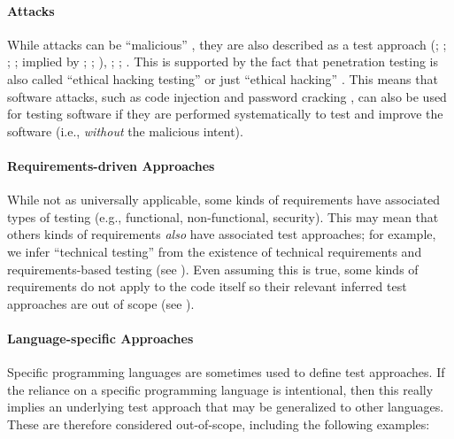    \paragraph{Attacks}\label{attacks}
    While attacks can be ``malicious'' \citep[p.~7]{IEEE2017}, they are also
    described as a test approach \ifnotpaper
        (\citeyear[pp.~4, 34]{IEEE2022}; \citeyear[p.~4]{IEEE2021};
        \citeyear[p.~7]{IEEE2019a}; \citealpISTQB{}; implied by
        \citealp[p.~5\=/10]{SWEBOK2024}; \citealp[p.~26]{Bas2024};
        \citealp[p.~87\==89]{Patton2006})\else \cite[pp.~4, 34]{IEEE2022},
        \cite[p.~4]{IEEE2021}; \cite[p.~7]{IEEE2019a}; \cite{ISTQB}\fi.
    This is supported by the fact that penetration testing is also called
    ``ethical hacking testing'' \citep[p.~13\=/4]{SWEBOK2024} or just ``ethical
    hacking'' \citep[p.~28; see ]{Gerrard2000b}. This
    means that software attacks, such as code injection and password cracking
    \citepISTQB{}, can also be used for testing software if they are performed
    systematically to test and improve the software (i.e., \emph{without} the
    malicious intent).

    \paragraph{Requirements-driven Approaches}\label{req-test}
    While not as universally applicable, some kinds of requirements have associated
    types of testing (e.g., functional, non-functional, security). This may mean
    that others kinds of requirements \emph{also} have associated test approaches;
    for example, we infer ``technical testing'' from the existence of technical
    requirements \citep[p.~463]{IEEE2017} and requirements-based testing
    (see ). \ifnotpaper Even assuming this is true, some kinds of
        requirements do not apply to the code itself so their relevant inferred
        test approaches are out of scope (see ).\fi

    \paragraph{Language-specific Approaches}\label{lang-test}
    Specific programming languages are sometimes used to define test approaches.
    If the reliance on a specific programming language is intentional, then
    this really implies an underlying test approach that may be generalized to
    other languages. These are therefore considered out-of-scope,
    including the following examples:


